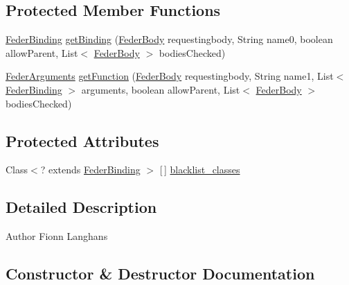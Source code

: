\subsection*{Protected Member Functions}
\begin{DoxyCompactItemize}
\item 
\hyperlink{classfeder_1_1types_1_1FederBinding}{Feder\+Binding} \hyperlink{classfeder_1_1types_1_1FederBody_a0e81024eaf979b1dc4b0b279885380c8}{get\+Binding} (\hyperlink{classfeder_1_1types_1_1FederBody}{Feder\+Body} requestingbody, String name0, boolean allow\+Parent, List$<$ \hyperlink{classfeder_1_1types_1_1FederBody}{Feder\+Body} $>$ bodies\+Checked)
\item 
\hyperlink{interfacefeder_1_1types_1_1FederArguments}{Feder\+Arguments} \hyperlink{classfeder_1_1types_1_1FederBody_ae2d7a27c12b0dbd096ec638792d69adc}{get\+Function} (\hyperlink{classfeder_1_1types_1_1FederBody}{Feder\+Body} requestingbody, String name1, List$<$ \hyperlink{classfeder_1_1types_1_1FederBinding}{Feder\+Binding} $>$ arguments, boolean allow\+Parent, List$<$ \hyperlink{classfeder_1_1types_1_1FederBody}{Feder\+Body} $>$ bodies\+Checked)
\end{DoxyCompactItemize}
\subsection*{Protected Attributes}
\begin{DoxyCompactItemize}
\item 
Class$<$? extends \hyperlink{classfeder_1_1types_1_1FederBinding}{Feder\+Binding} $>$ \mbox{[}$\,$\mbox{]} \hyperlink{classfeder_1_1types_1_1FederBody_a0408b11249a7eaa41bd71fdfba5bbfb9}{blacklist\+\_\+classes}
\end{DoxyCompactItemize}


\subsection{Detailed Description}
\begin{DoxyAuthor}{Author}
Fionn Langhans 
\end{DoxyAuthor}


\subsection{Constructor \& Destructor Documentation}
\mbox{\label{classfeder_1_1types_1_1FederBody_a2c3c09316750c434564ad48b7915fe62}} 
